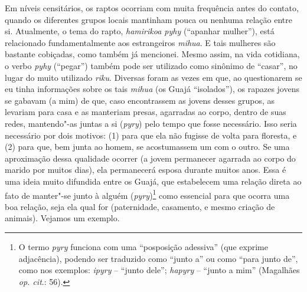 Em níveis censitários, os raptos ocorriam com muita frequência antes do
contato, quando os diferentes grupos locais mantinham pouca ou nenhuma
relação entre si. Atualmente, o tema do rapto, \emph{hamirikoa pyhy}
(``apanhar mulher''), está relacionado fundamentalmente aos estrangeiros
\emph{mihua}. E tais mulheres são bastante cobiçadas, como também já
mencionei. Mesmo assim, na vida cotidiana, o verbo \emph{pyhy} (``pegar'')
também pode ser utilizado como sinônimo de ``casar'', no lugar do muito
utilizado \emph{riku}. Diversas foram as vezes em que, ao questionarem
se eu tinha informações sobre os tais \emph{mihua} (os Guajá
``isolados''), os rapazes jovens se gabavam (a mim) de que, caso
encontrassem as jovens desses grupos, as levariam para casa e as
manteriam presas, agarradas ao corpo, dentro de suas redes, mantendo"-as
juntas a si (\emph{pyry}) pelo tempo que fosse necessário. Isso seria
necessário por dois motivos: (1) para que ela não fugisse de volta para
floresta, e (2) para que, bem junta ao homem, se acostumassem um com o
outro. Se uma aproximação dessa qualidade ocorrer (a jovem permanecer
agarrada ao corpo do marido por muitos dias), ela permanecerá esposa
durante muitos anos. Essa é uma ideia muito difundida entre os Guajá,
que estabelecem uma relação direta ao fato de manter"-se junto à alguém
(\emph{pyry})\footnote{O termo \emph{pyry} funciona com uma ``posposição
  adessiva'' (que exprime adjacência), podendo ser traduzido como ``junto
  a'' ou como ``para junto de'', como nos exemplos: \emph{ipyry} -- ``junto
  dele''; \emph{hapyry} -- ``junto a mim'' (Magalhães \emph{op. cit}.: 56).} como
essencial para que ocorra uma boa relação, seja ela qual for
(paternidade, casamento, e mesmo criação de animais). Vejamos um
exemplo.

